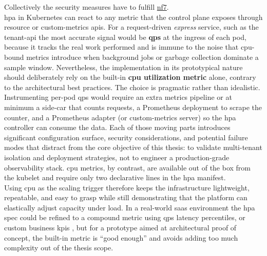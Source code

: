 \documentclass[11pt, a4paper, oneside, listof=totoc]{scrartcl}
\begin{document}
                Collectively the security measures have to fulfill \hyperlink{NF-07}{nf7}. \\
                \gls{hpa} in Kubernetes can react to any metric that the control plane exposes
                through resource or custom-metrics \glspl{api}.
                For a request-driven \textit{express} service, such as the tenant-\gls{api} the most
                accurate signal would be \textbf{\gls{qps}} at the ingress of each pod, because it
                tracks the real work performed and is immune to the noise that \gls{cpu}-bound
                metrics introduce when background jobs or garbage collection dominate a sample
                window.
                Nevertheless, the implementation in its prototypical nature should deliberately rely
                on the built-in \textbf{\gls{cpu} utilization metric} alone, contrary to the
                architectural best practices.
                The choice is pragmatic rather than idealistic.
                Instrumenting per-pod \gls{qps} would require an extra metrics pipeline or at
                minimum a side-car that counts requests, a Prometheus deployment to scrape the
                counter, and a Prometheus adapter (or custom-metrics server) so the \gls{hpa}
                controller can consume the data.
                Each of those moving parts introduces significant configuration surface, security
                considerations, and potential failure modes that distract from the core objective of
                this thesis: to validate multi-tenant isolation and deployment strategies, not to
                engineer a production-grade observability stack.
                \gls{cpu} metrics, by contrast, are available out of the box from the kubelet and
                require only two declarative lines in the \gls{hpa} manifest.
                \\
                Using \gls{cpu} as the scaling trigger therefore keeps the infrastructure
                lightweight, repeatable, and easy to grasp while still demonstrating that the
                platform can elastically adjust capacity under load.
                In a real-world \gls{saas} environment the \gls{hpa} spec could be refined to a
                compound metric using \gls{qps} latency percentiles, or custom business \glspl{kpi}
                , but for a prototype aimed at architectural proof of concept, the
                built-in metric is \enquote{good enough} and avoids adding too much complexity out
                of the thesis scope.
                
\end{document}
